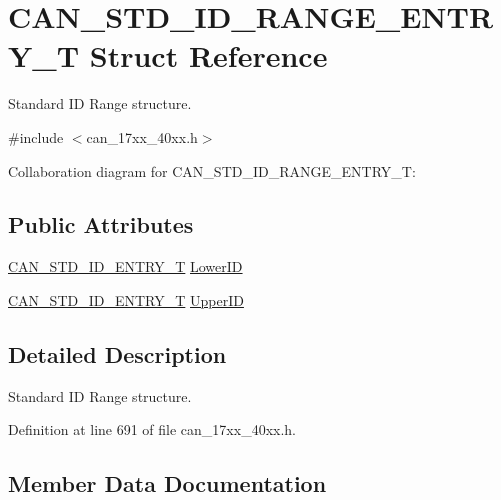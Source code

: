 \hypertarget{structCAN__STD__ID__RANGE__ENTRY__T}{}\section{C\+A\+N\+\_\+\+S\+T\+D\+\_\+\+I\+D\+\_\+\+R\+A\+N\+G\+E\+\_\+\+E\+N\+T\+R\+Y\+\_\+T Struct Reference}
\label{structCAN__STD__ID__RANGE__ENTRY__T}


Standard ID Range structure.  




{\ttfamily \#include $<$can\+\_\+17xx\+\_\+40xx.\+h$>$}



Collaboration diagram for C\+A\+N\+\_\+\+S\+T\+D\+\_\+\+I\+D\+\_\+\+R\+A\+N\+G\+E\+\_\+\+E\+N\+T\+R\+Y\+\_\+T\+:
\subsection*{Public Attributes}
\begin{DoxyCompactItemize}
\item 
\hyperlink{structCAN__STD__ID__ENTRY__T}{C\+A\+N\+\_\+\+S\+T\+D\+\_\+\+I\+D\+\_\+\+E\+N\+T\+R\+Y\+\_\+T} \hyperlink{structCAN__STD__ID__RANGE__ENTRY__T_a8e71d9944856371e26c1f42fcdc124f7}{Lower\+ID}
\item 
\hyperlink{structCAN__STD__ID__ENTRY__T}{C\+A\+N\+\_\+\+S\+T\+D\+\_\+\+I\+D\+\_\+\+E\+N\+T\+R\+Y\+\_\+T} \hyperlink{structCAN__STD__ID__RANGE__ENTRY__T_a5c92aad98ca02e625a651b5509a4bd6e}{Upper\+ID}
\end{DoxyCompactItemize}


\subsection{Detailed Description}
Standard ID Range structure. 

Definition at line 691 of file can\+\_\+17xx\+\_\+40xx.\+h.



\subsection{Member Data Documentation}
